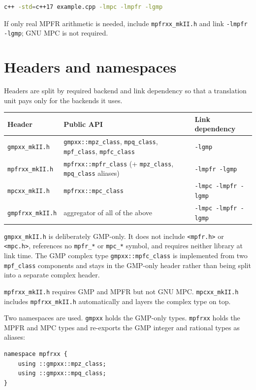 \documentclass[11pt,a4paper]{article}
\newcommand{\code}[1]{\lstinline!#1!}
\begin{document}
\begin{lstlisting}[language=bash]
c++ -std=c++17 example.cpp -lmpc -lmpfr -lgmp
\end{lstlisting}

If only real MPFR arithmetic is needed, include \code{mpfrxx_mkII.h} and link
\code{-lmpfr -lgmp}; GNU MPC is not required.

\section{Headers and namespaces}

Headers are split by required backend and link dependency so that a translation
unit pays only for the backends it uses.

\begin{longtable}{@{}llp{}@{}}
\toprule
\textbf{Header} & \textbf{Public API} & \textbf{Link dependency} \\
\midrule
\endhead
\code{gmpxx_mkII.h}   & \code{gmpxx::mpz_class}, \code{mpq_class}, \code{mpf_class}, \code{mpfc_class} & \code{-lgmp} \\
\code{mpfrxx_mkII.h}  & \code{mpfrxx::mpfr_class} (+ \code{mpz_class}, \code{mpq_class} aliases) & \code{-lmpfr -lgmp} \\
\code{mpcxx_mkII.h}   & \code{mpfrxx::mpc_class} & \code{-lmpc -lmpfr -lgmp} \\
\code{gmpfrxx_mkII.h} & aggregator of all of the above & \code{-lmpc -lmpfr -lgmp} \\
\bottomrule
\end{longtable}

\code{gmpxx_mkII.h} is deliberately GMP-only. It does not include \code{<mpfr.h>}
or \code{<mpc.h>}, references no \code{mpfr_*} or \code{mpc_*} symbol, and requires
neither library at link time. The GMP complex type \code{gmpxx::mpfc_class} is
implemented from two \code{mpf_class} components and stays in the GMP-only header
rather than being split into a separate complex header.

\code{mpfrxx_mkII.h} requires GMP and MPFR but not GNU MPC.
\code{mpcxx_mkII.h} includes \code{mpfrxx_mkII.h} automatically and layers the
complex type on top.

Two namespaces are used. \code{gmpxx} holds the GMP-only types.
\code{mpfrxx} holds the MPFR and MPC types and re-exports the GMP integer and
rational types as aliases:

\begin{lstlisting}
namespace mpfrxx {
    using ::gmpxx::mpz_class;
    using ::gmpxx::mpq_class;
}
\end{lstlisting}
\end{document}
